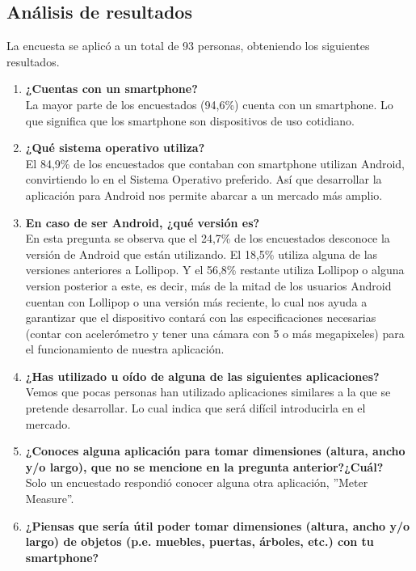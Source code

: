 \subsection{Análisis de resultados}
La encuesta se aplicó a un total de 93 personas, obteniendo los siguientes resultados.
    \begin{enumerate}
        \item \textbf{¿Cuentas con un smartphone?}\\
        La mayor parte de los encuestados (94,6\%) cuenta con un smartphone. Lo que significa que los smartphone son dispositivos de uso cotidiano.
        \item \textbf{¿Qué sistema operativo utiliza?}\\
        El 84,9\% de los encuestados que contaban con smartphone utilizan Android, convirtiendo lo en el Sistema Operativo preferido. Así que desarrollar la aplicación para Android nos permite abarcar a un mercado más amplio.
        \item \textbf{En caso de ser Android, ¿qué versión es?}\\
        En esta pregunta se observa que el 24,7\% de los encuestados desconoce la versión de Android que están utilizando. El 18,5\% utiliza alguna de las versiones anteriores a Lollipop. Y el 56,8\% restante utiliza Lollipop o alguna version posterior a este, es decir, más de la mitad de los usuarios Android cuentan con Lollipop o una versión más reciente, lo cual nos ayuda a garantizar que el dispositivo contará con las especificaciones necesarias (contar con acelerómetro y tener una cámara con 5 o más megapixeles)  para el funcionamiento de nuestra aplicación.
        \item \textbf{¿Has utilizado u oído de alguna de las siguientes aplicaciones?}\\
        Vemos que pocas personas han utilizado aplicaciones similares a la que se pretende desarrollar. Lo cual indica que será difícil introducirla en el mercado.
        \item \textbf{¿Conoces alguna aplicación para tomar dimensiones (altura, ancho y/o largo), que no se mencione en la pregunta anterior?¿Cuál?}\\
	    Solo un encuestado respondió conocer alguna otra aplicación, ''Meter Measure''.
	    \item \textbf{¿Piensas que sería útil poder tomar dimensiones (altura, ancho y/o largo) de objetos (p.e. muebles, puertas, árboles, etc.) con tu smartphone?}\\

\end{enumerate}
